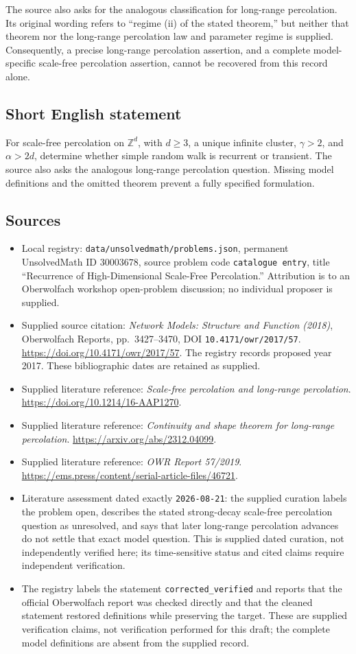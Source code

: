 \documentclass[11pt]{article}
\newcommand{\Z}{\mathbb{Z}}
\begin{document}
The source also asks for the analogous classification for long-range percolation. Its original wording refers to ``regime (ii) of the stated theorem,'' but neither that theorem nor the long-range percolation law and parameter regime is supplied. Consequently, a precise long-range percolation assertion, and a complete model-specific scale-free percolation assertion, cannot be recovered from this record alone.
\subsection{Short English statement}
For scale-free percolation on \(\Z^d\), with \(d\geq3\), a unique infinite cluster, \(\gamma>2\), and \(\alpha>2d\), determine whether simple random walk is recurrent or transient. The source also asks the analogous long-range percolation question. Missing model definitions and the omitted theorem prevent a fully specified formulation.
\subsection{Sources}
\begin{itemize}
\item Local registry: \texttt{data/unsolvedmath/problems.json}, permanent UnsolvedMath ID \(30003678\), source problem code \texttt{catalogue entry}, title ``Recurrence of High-Dimensional Scale-Free Percolation.'' Attribution is to an Oberwolfach workshop open-problem discussion; no individual proposer is supplied.
\item Supplied source citation: \emph{Network Models: Structure and Function (2018)}, Oberwolfach Reports, pp.~3427--3470, DOI \texttt{10.4171/owr/2017/57}. \url{https://doi.org/10.4171/owr/2017/57}. The registry records proposed year 2017. These bibliographic dates are retained as supplied.
\item Supplied literature reference: \emph{Scale-free percolation and long-range percolation}. \url{https://doi.org/10.1214/16-AAP1270}.
\item Supplied literature reference: \emph{Continuity and shape theorem for long-range percolation}. \url{https://arxiv.org/abs/2312.04099}.
\item Supplied literature reference: \emph{OWR Report 57/2019}. \url{https://ems.press/content/serial-article-files/46721}.
\item Literature assessment dated exactly \texttt{2026-08-21}: the supplied curation labels the problem open, describes the stated strong-decay scale-free percolation question as unresolved, and says that later long-range percolation advances do not settle that exact model question. This is supplied dated curation, not independently verified here; its time-sensitive status and cited claims require independent verification.
\item The registry labels the statement \texttt{corrected\_verified} and reports that the official Oberwolfach report was checked directly and that the cleaned statement restored definitions while preserving the target. These are supplied verification claims, not verification performed for this draft; the complete model definitions are absent from the supplied record.
\end{itemize}
\end{document}
